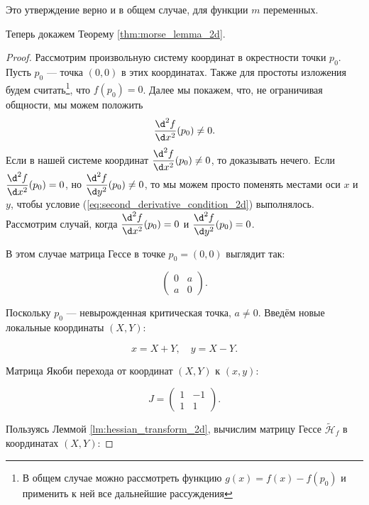\documentclass[a4paper,12pt,openany,leqno]{extbook}
\begin{document}
Это утверждение верно и в общем случае, для функции $m$ переменных.

Теперь докажем Теорему \ref{thm:morse_lemma_2d}.

\begin{proof}
Рассмотрим произвольную систему координат в окрестности точки $p_0$. Пусть $p_0$ --- точка $(0, 0)$ в этих координатах. Также для простоты изложения будем считать\footnote{В общем случае можно рассмотреть функцию $g(x) = f(x) - f(p_0)$ и применить к ней все дальнейшие рассуждения}, что $f(p_0) = 0$. Далее мы покажем, что, не ограничивая общности, мы можем положить
\begin{equation}
\dfrac{\d^2 f}{\d x^2}(p_0) \neq 0.
\label{eq:second_derivative_condition_2d}
\end{equation}
Если в нашей системе координат $\dfrac{\d^2 f}{\d x^2}(p_0) \neq 0$, то доказывать нечего. Если $\dfrac{\d^2 f}{\d x^2}(p_0) = 0$, но $\dfrac{\d^2 f}{\d y^2}(p_0) \neq 0$, то мы можем просто поменять местами оси $x$ и $y$, чтобы условие (\ref{eq:second_derivative_condition_2d}) выполнялось. Рассмотрим случай, когда $\dfrac{\d^2 f}{\d x^2}(p_0) = 0$ и $\dfrac{\d^2 f}{\d y^2}(p_0) = 0$.

В этом случае матрица Гессе в точке $p_0 = (0, 0)$ выглядит так:

\begin{equation}
\left(
  \begin{array}{rl}
   0 & a\\
   a & 0
  \end{array}
\right).
\end{equation}

Поскольку $p_0$ --- невырожденная критическая точка, $a \neq 0$. Введём новые локальные координаты $(X, Y)$:

\begin{equation}
x = X + Y,\quad y = X - Y.
\end{equation}

Матрица Якоби перехода от координат $(X, Y)$ к $(x, y)$:

\begin{equation}
J =
\left(
  \begin{array}{cc}
   1 & -1\\
   1 & 1
  \end{array}
\right).
\end{equation}

Пользуясь Леммой \ref{lm:hessian_transform_2d}, вычислим матрицу Гессе $\widetilde{\mathcal{H}}_f$ в координатах $(X, Y)$:


\end{proof}
\end{document}
